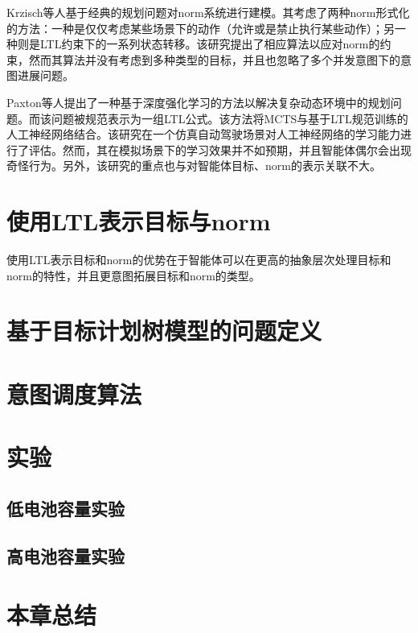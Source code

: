 Krzisch等人\cite{}基于经典的规划问题对norm系统进行建模。其考虑了两种norm形式化的方法：一种是仅仅考虑某些场景下的动作（允许或是禁止执行某些动作）；另一种则是LTL约束下的一系列状态转移。该研究提出了相应算法以应对norm的约束，然而其算法并没有考虑到多种类型的目标，并且也忽略了多个并发意图下的意图进展问题。

Paxton等人\cite{}提出了一种基于深度强化学习的方法以解决复杂动态环境中的规划问题。而该问题被规范表示为一组LTL公式。该方法将MCTS与基于LTL规范训练的人工神经网络结合。该研究在一个仿真自动驾驶场景对人工神经网络的学习能力进行了评估。然而，其在模拟场景下的学习效果并不如预期，并且智能体偶尔会出现奇怪行为。另外，该研究的重点也与对智能体目标、norm的表示关联不大。


\section{使用LTL表示目标与norm}
使用LTL表示目标和norm的优势在于智能体可以在更高的抽象层次处理目标和norm的特性，并且更意图拓展目标和norm的类型。
\section{基于目标计划树模型的问题定义}
\section{\SAT 意图调度算法}
\section{实验}
\subsection{低电池容量实验}
\subsection{高电池容量实验}
\section{本章总结}
